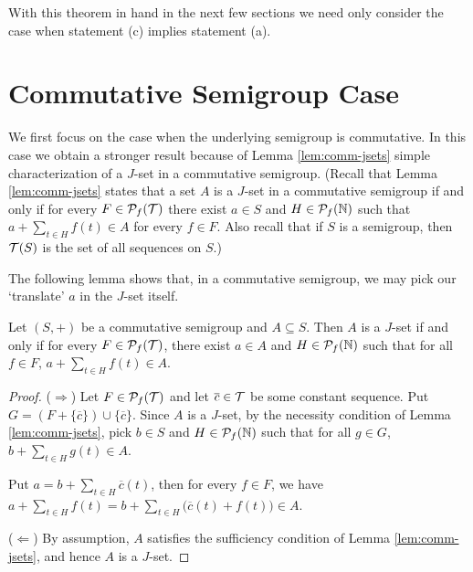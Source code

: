 With this theorem in hand in the next few sections we need only consider the case when statement (c) implies statement (a).

\section{Commutative Semigroup Case}
We first focus on the case when the underlying semigroup is commutative. 
In this case we obtain a stronger result because of Lemma \ref{lem:comm-jsets} simple characterization of a $J$-set in a commutative semigroup.
(Recall that Lemma \ref{lem:comm-jsets} states that a set $A$ is a $J$-set in a commutative semigroup if and only if for every $F \in \mathcal{P}_f(\mathcal{T})$ there exist $a \in S$ and $H \in \mathcal{P}_f(\mathbb{N})$ such that $a + \sum_{t \in H} f(t) \in A$ for every $f \in F$.
Also recall that if $S$ is a semigroup, then $\mathcal{T}(S)$ is the set of all sequences on $S$.)


The following lemma shows that, in a commutative semigroup, we may pick our `translate' $a$ in the $J$-set itself.
\begin{lem}
  \label{lem:comm-trans}
  Let $(S, +)$ be a commutative semigroup and $A \subseteq S$.
  Then $A$ is a $J$-set if and only if for every $F \in \mathcal{P}_f(\mathcal{T})$, there exist $a \in A$ and $H \in \mathcal{P}_f(\mathbb{N})$ such that for all $f \in F$, $a + \sum_{t \in H} f(t) \in A$.
\end{lem}
\begin{proof}
  ($\Rightarrow$)
  Let $F \in \mathcal{P}_f(\mathcal{T})$ and let $\overline{c} \in \mathcal{T}$ be some constant sequence.
  Put $G = (F + \{\overline{c}\}) \cup \{\overline{c}\}$. 
  Since $A$ is a $J$-set, by the necessity condition of Lemma \ref{lem:comm-jsets}, pick $b \in S$ and $H \in \mathcal{P}_f(\mathbb{N})$ such that for all $g \in G$, $b + \sum_{t \in H} g(t) \in A$. 

  Put $a = b + \sum_{t \in H} \overline{c}(t)$, then for every $f \in F$, we have $a + \sum_{t \in H} f(t) = b + \sum_{t \in H}\bigl( \overline{c}(t) + f(t) \bigr) \in A$. 
  
  ($\Leftarrow$)
  By assumption, $A$ satisfies the sufficiency condition of Lemma \ref{lem:comm-jsets}, and hence $A$ is a $J$-set.
\end{proof}


